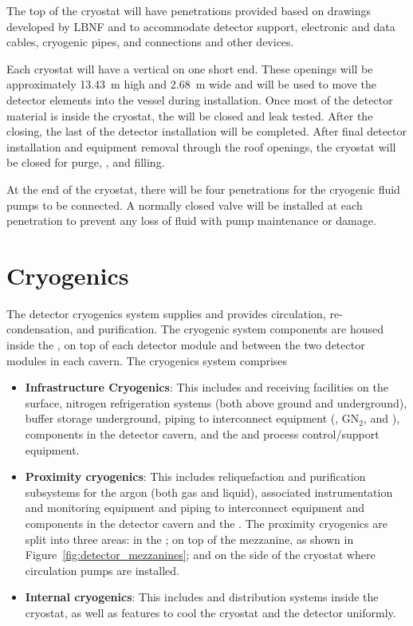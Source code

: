 The top of the cryostat will have penetrations provided based on
drawings developed by LBNF and  to accommodate detector support,
electronic and data cables, cryogenic pipes, and connections and other
devices.

Each cryostat will have a vertical  on one short end.
These openings will be approximately \SI{13.43}{\meter} high and
\SI{2.68}{\meter} wide and will be used to move the detector elements
into the vessel during installation.  Once most of the detector
material is inside the cryostat, the  will be closed and
leak tested.  After the  closing, the last of the detector
installation will be completed. After final detector installation and
equipment removal through the roof openings, the cryostat will be
closed for purge, \cooldown{}, and filling.

At the  end of the cryostat, there will be four penetrations for
the cryogenic fluid pumps to be connected.  A normally closed valve
will be installed at each penetration to prevent any loss of fluid
with pump maintenance or damage.

\section{Cryogenics}
\label{sec:fdsp-coord-cryogenics}


The detector cryogenics system supplies  and provides
circulation, re-condensation, and purification. The cryogenic system
components are housed inside the , on top of each detector module
and between the two detector modules in each cavern. The cryogenics system comprises 
\begin{itemize}
\item {\bf Infrastructure Cryogenics}: This includes  and  receiving
  facilities on the surface, nitrogen refrigeration systems (both
  above ground and underground),  buffer storage
  underground, piping to interconnect equipment (, GN$_2$, and ),
  components in the detector cavern, and the  and process control/support
  equipment.
\item {\bf Proximity cryogenics}: This includes reliquefaction 
  and purification subsystems for the argon (both gas and liquid), associated
  instrumentation and monitoring equipment and  piping to
  interconnect equipment and components in the detector cavern and the
  . The proximity cryogenics are split into three areas: in the
  ; on top of the mezzanine, as shown in Figure~\ref{fig:detector_mezzanines};
  and on the side of the cryostat where  circulation pumps are installed.
\item {\bf Internal cryogenics}: This includes  and  distribution
  systems inside the cryostat, as well as features to cool the
  cryostat and the detector uniformly.
\end{itemize}

